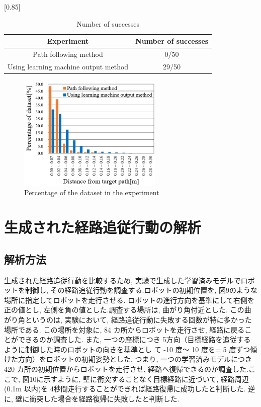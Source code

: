 \documentclass{jarticle}
\begin{document}
\begin{table}[htbp]
  \centering
  \caption{Number of successes} \vspace*{2mm}
    \scalebox{0.85}[0.85] {
    \begin{tabular}{|c|c|}
      \hline\hline
      Experiment & Number of successes \\
      \hline\hline
      Path following method & 0/50 \\
      Using learning machine output method & 29/50 \\
      \hline
    \end{tabular} }
\end {table}


\begin{figure}[htbp]
  \centering
   \includegraphics[height=55mm]{./figs/tes.png}
   \caption{Percentage of the dataset in the experiment}
\end{figure}


\section{生成された経路追従行動の解析}
\subsection{解析方法}
生成された経路追従行動を比較するため, 実験で生成した学習済みモデルでロボットを制御し, 
その経路追従行動を調査する.ロボットの初期位置を,  図9のような場所に指定してロボットを走行させる.
ロボットの進行方向を基準にして右側を正の値とし, 左側を負の値とした.調査する場所は, 曲がり角付近とした. 
この曲がり角というのは, 実験において, 経路追従行動に失敗する回数が特に多かった場所である.
この場所を対象に,  84 カ所からロボットを走行させ, 経路に戻ることができるのか調査した.
また, 一つの座標につき 5方向（目標経路を追従するように制御した時のロボットの向きを基準とし
て -10 度〜 10 度を± 5 度ずつ傾けた方向）をロボットの初期姿勢とした. 
つまり,  一つの学習済みモデルにつき 420 カ所の初期位置からロボットを走行させ, 
経路へ復帰できるのか調査した.ここで, 図10に示すように, 壁に衝突することなく目標経路に近づいて, 
経路周辺 (0.1m 以内)を 4秒間走行することができれば経路復帰に成功したと判断した.
逆に, 壁に衝突した場合を経路復帰に失敗したと判断した.
\end{document}
